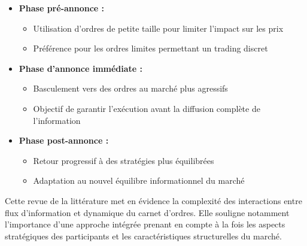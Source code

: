 \documentclass[12pt,a4paper]{article}
\theoremstyle{definition}
\theoremstyle{remark}
\begin{document}
    \begin{itemize}
        \item \textbf{Phase pré-annonce :}
        \begin{itemize}
            \item Utilisation d'ordres de petite taille pour limiter l'impact sur les prix
            \item Préférence pour les ordres limites permettant un trading discret
        \end{itemize}
        
        \item \textbf{Phase d'annonce immédiate :}
        \begin{itemize}
            \item Basculement vers des ordres au marché plus agressifs
            \item Objectif de garantir l'exécution avant la diffusion complète de l'information
        \end{itemize}
        
        \item \textbf{Phase post-annonce :}
        \begin{itemize}
            \item Retour progressif à des stratégies plus équilibrées
            \item Adaptation au nouvel équilibre informationnel du marché
        \end{itemize}
    \end{itemize}

    Cette revue de la littérature met en évidence la complexité des interactions entre flux d'information et dynamique du carnet d'ordres. Elle souligne notamment l'importance d'une approche intégrée prenant en compte à la fois les aspects stratégiques des participants et les caractéristiques structurelles du marché.

    
\end{document}

